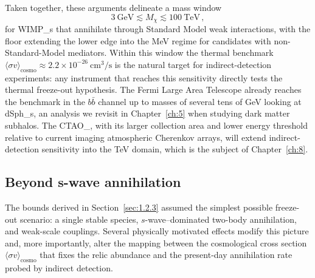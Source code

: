 Taken together, these arguments delineate a mass window
\begin{equation}
	3~\mathrm{GeV} \lesssim M_\chi \lesssim 100~\mathrm{TeV}\,,
	\label{eq:wimp_window}
\end{equation}
for \glspl{WIMP_} that annihilate through Standard Model weak interactions, with the \BBN floor extending the lower edge into the MeV regime for candidates with non-Standard-Model mediators.
Within this window the thermal benchmark $\langle \sigma v \rangle_\mathrm{cosmo} \approx 2.2 \times 10^{-26}~\mathrm{cm}^3/\mathrm{s}$ is the natural target for indirect-detection experiments: any instrument that reaches this sensitivity directly tests the thermal freeze-out hypothesis.
The Fermi Large Area Telescope already reaches the benchmark in the $b\bar b$ channel up to masses of several tens of GeV looking at \glspl{dSph_}, an analysis we revisit in Chapter~\ref{ch:5} when studying dark matter subhalos. The \gls{CTAO_}, with its larger collection area and lower energy threshold relative to current imaging atmospheric Cherenkov arrays, will extend indirect-detection sensitivity into the TeV domain, which is the subject of Chapter~\ref{ch:8}.

\subsection{Beyond s-wave annihilation}
\label{sec:1.2.4}

The bounds derived in Section~\ref{sec:1.2.3} assumed the simplest possible freeze-out scenario: a single stable species, $s$-wave--dominated two-body annihilation, and weak-scale couplings.
Several physically motivated effects modify this picture and, more importantly, alter the mapping between the cosmological cross section $\langle\sigma v\rangle_\mathrm{cosmo}$ that fixes the relic abundance and the present-day annihilation rate probed by indirect detection.

